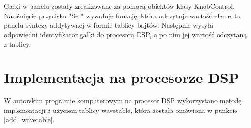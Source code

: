 Gałki w panelu zostały zrealizowane za pomocą obiektów klasy KnobControl. Naciśnięcie przycisku "Set" wywołuje funkcję, która odczytuje wartość elementu panelu syntezy addytywnej w formie tablicy bajtów. Następnie wysyła odpowiedni identyfikator gałki do procesora DSP, a po nim jej wartość odczytaną z tablicy.

\section{Implementacja na procesorze DSP}
W autorskim programie komputerowym na procesor DSP wykorzystano metodę implementacji z użyciem tablicy wavetable, która została omówiona w punkcie \ref{add_wavetable}. 